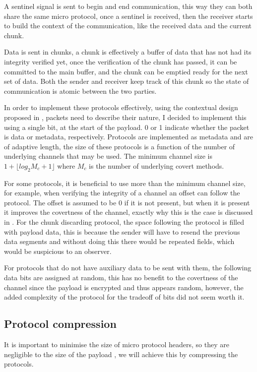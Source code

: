 A sentinel signal is sent to begin and end communication, this way they can both share the same micro protocol, once a sentinel is received, then the receiver starts to build the context of the communication, like the received data and the current chunk.

Data is sent in chunks, a chunk is effectively a buffer of data that has not had its integrity verified yet, once the verification of the chunk has passed, it can be committed to the main buffer, and the chunk can be emptied ready for the next set of data. Both the sender and receiver keep track of this chunk so the state of communication is atomic between the two parties.

In order to implement these protocols effectively, using the contextual design proposed in \cite{rfc1144}, packets need to describe their nature, I decided to implement this using a single bit, at the start of the payload. 0 or 1 indicate whether the packet is data or metadata, respectively. Protocols are implemented as metadata and are of adaptive length, the size of these protocols is a function of the number of underlying channels that may be used. The minimum channel size is $1 + \lfloor log_2{M_c + 1} \rfloor$ where $M_c$ is the number of underlying covert methods.

For some protocols, it is beneficial to use more than the minimum channel size, for example, when verifying the integrity of a channel an offset can follow the protocol. The offset is assumed to be 0 if it is not present, but when it is present it improves the covertness of the channel, exactly why this is the case is discussed in . For the chunk discarding protocol, the space following the protocol is filled with payload data, this is because the sender will have to resend the previous data segments and without doing this there would be repeated fields, which would be suspicious to an observer.

For protocols that do not have auxiliary data to be sent with them, the following data bits are assigned at random, this has no benefit to the covertness of the channel since the payload is encrypted and thus appears random, however, the added complexity of the protocol for the tradeoff of bits did not seem worth it.


\subsection{Protocol compression}

It is important to minimise the size of micro protocol headers, so they are negligible to the size of the payload \cite{DRiCCBoCP}, we will achieve this by compressing the protocols.

